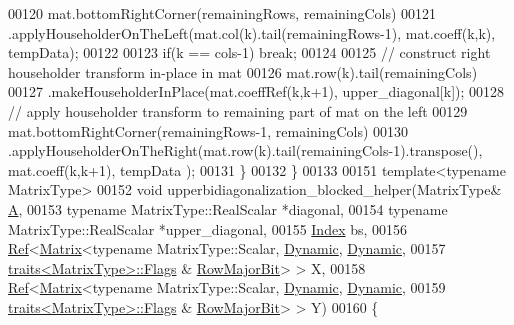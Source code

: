 \begin{DoxyCode}
00120     mat.bottomRightCorner(remainingRows, remainingCols)
00121        .applyHouseholderOnTheLeft(mat.col(k).tail(remainingRows-1), mat.coeff(k,k), tempData);
00122 
00123     \textcolor{keywordflow}{if}(k == cols-1) \textcolor{keywordflow}{break};
00124 
00125     \textcolor{comment}{// construct right householder transform in-place in mat}
00126     mat.row(k).tail(remainingCols)
00127        .makeHouseholderInPlace(mat.coeffRef(k,k+1), upper\_diagonal[k]);
00128     \textcolor{comment}{// apply householder transform to remaining part of mat on the left}
00129     mat.bottomRightCorner(remainingRows-1, remainingCols)
00130        .applyHouseholderOnTheRight(mat.row(k).tail(remainingCols-1).transpose(), mat.coeff(k,k+1), tempData
      );
00131   \}
00132 \}
00133 
00151 \textcolor{keyword}{template}<\textcolor{keyword}{typename} MatrixType>
00152 \textcolor{keywordtype}{void} upperbidiagonalization\_blocked\_helper(MatrixType& \hyperlink{group___core___module_class_eigen_1_1_matrix}{A},
00153                                            \textcolor{keyword}{typename} MatrixType::RealScalar *diagonal,
00154                                            \textcolor{keyword}{typename} MatrixType::RealScalar *upper\_diagonal,
00155                                            \hyperlink{class_eigen_1_1internal_1_1_upper_bidiagonalization_adcb14f3919a3dcc9977ba6b8105087fe}{Index} bs,
00156                                            \hyperlink{group___core___module_class_eigen_1_1_ref}{Ref}<\hyperlink{group___core___module_class_eigen_1_1_matrix}{Matrix}<\textcolor{keyword}{typename} MatrixType::Scalar, 
      \hyperlink{namespace_eigen_ad81fa7195215a0ce30017dfac309f0b2}{Dynamic}, \hyperlink{namespace_eigen_ad81fa7195215a0ce30017dfac309f0b2}{Dynamic},
00157                                                       \hyperlink{struct_eigen_1_1internal_1_1traits}{traits<MatrixType>::Flags} & 
      \hyperlink{group__flags_gae4f56c2a60bbe4bd2e44c5b19cbe8762}{RowMajorBit}> > X,
00158                                            \hyperlink{group___core___module_class_eigen_1_1_ref}{Ref}<\hyperlink{group___core___module_class_eigen_1_1_matrix}{Matrix}<\textcolor{keyword}{typename} MatrixType::Scalar, 
      \hyperlink{namespace_eigen_ad81fa7195215a0ce30017dfac309f0b2}{Dynamic}, \hyperlink{namespace_eigen_ad81fa7195215a0ce30017dfac309f0b2}{Dynamic},
00159                                                       \hyperlink{struct_eigen_1_1internal_1_1traits}{traits<MatrixType>::Flags} & 
      \hyperlink{group__flags_gae4f56c2a60bbe4bd2e44c5b19cbe8762}{RowMajorBit}> > Y)
00160 \{

\end{DoxyCode}
